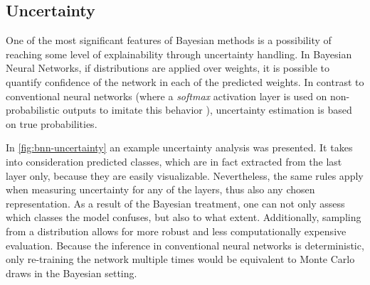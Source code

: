 \subsection{Uncertainty}
One of the most significant features of Bayesian methods is a possibility of reaching some level of explainability through uncertainty handling. In Bayesian Neural Networks, if distributions are applied over weights, it is possible to quantify confidence of the network in each of the predicted weights. In contrast to conventional neural networks (where a \textit{softmax} activation layer is used on non-probabilistic outputs to imitate this behavior \cite{Gal2016, Pearce2021}), uncertainty estimation is based on true probabilities.

\vspace{\baselineskip}
In \autoref{fig:bnn-uncertainty} an example uncertainty analysis was presented. It takes into consideration predicted classes, which are in fact extracted from the last layer only, because they are easily visualizable. Nevertheless, the same rules apply when measuring uncertainty for any of the layers, thus also any chosen representation. As a result of the Bayesian treatment, one can not only assess which classes the model confuses, but also to what extent. Additionally, sampling from a distribution allows for more robust and less computationally expensive evaluation. Because the inference in conventional neural networks is deterministic, only re-training the network multiple times would be equivalent to Monte Carlo draws in the Bayesian setting.

